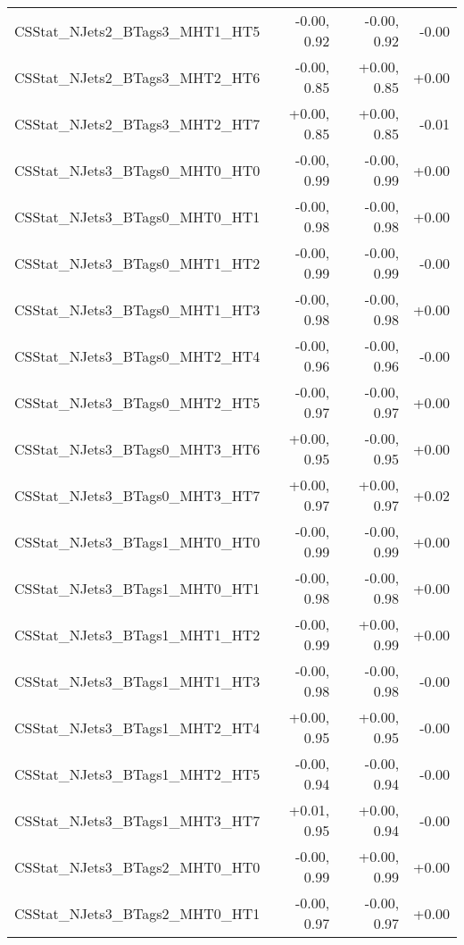 \begin{tabular}{|l|r|r|r|}
CSStat\_NJets2\_BTags3\_MHT1\_HT5        &      -0.00, 0.92 &     -0.00, 0.92 &  -0.00 \\
CSStat\_NJets2\_BTags3\_MHT2\_HT6        &      -0.00, 0.85 &     +0.00, 0.85 &  +0.00 \\
CSStat\_NJets2\_BTags3\_MHT2\_HT7        &      +0.00, 0.85 &     +0.00, 0.85 &  -0.01 \\
CSStat\_NJets3\_BTags0\_MHT0\_HT0        &      -0.00, 0.99 &     -0.00, 0.99 &  +0.00 \\
CSStat\_NJets3\_BTags0\_MHT0\_HT1        &      -0.00, 0.98 &     -0.00, 0.98 &  +0.00 \\
CSStat\_NJets3\_BTags0\_MHT1\_HT2        &      -0.00, 0.99 &     -0.00, 0.99 &  -0.00 \\
CSStat\_NJets3\_BTags0\_MHT1\_HT3        &      -0.00, 0.98 &     -0.00, 0.98 &  +0.00 \\
CSStat\_NJets3\_BTags0\_MHT2\_HT4        &      -0.00, 0.96 &     -0.00, 0.96 &  -0.00 \\
CSStat\_NJets3\_BTags0\_MHT2\_HT5        &      -0.00, 0.97 &     -0.00, 0.97 &  +0.00 \\
CSStat\_NJets3\_BTags0\_MHT3\_HT6        &      +0.00, 0.95 &     -0.00, 0.95 &  +0.00 \\
CSStat\_NJets3\_BTags0\_MHT3\_HT7        &      +0.00, 0.97 &     +0.00, 0.97 &  +0.02 \\
CSStat\_NJets3\_BTags1\_MHT0\_HT0        &      -0.00, 0.99 &     -0.00, 0.99 &  +0.00 \\
CSStat\_NJets3\_BTags1\_MHT0\_HT1        &      -0.00, 0.98 &     -0.00, 0.98 &  +0.00 \\
CSStat\_NJets3\_BTags1\_MHT1\_HT2        &      -0.00, 0.99 &     +0.00, 0.99 &  +0.00 \\
CSStat\_NJets3\_BTags1\_MHT1\_HT3        &      -0.00, 0.98 &     -0.00, 0.98 &  -0.00 \\
CSStat\_NJets3\_BTags1\_MHT2\_HT4        &      +0.00, 0.95 &     +0.00, 0.95 &  -0.00 \\
CSStat\_NJets3\_BTags1\_MHT2\_HT5        &      -0.00, 0.94 &     -0.00, 0.94 &  -0.00 \\
CSStat\_NJets3\_BTags1\_MHT3\_HT7        &      +0.01, 0.95 &     +0.00, 0.94 &  -0.00 \\
CSStat\_NJets3\_BTags2\_MHT0\_HT0        &      -0.00, 0.99 &     +0.00, 0.99 &  +0.00 \\
CSStat\_NJets3\_BTags2\_MHT0\_HT1        &      -0.00, 0.97 &     -0.00, 0.97 &  +0.00 \\

\end{tabular}
